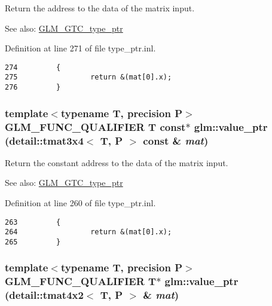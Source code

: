 Return the address to the data of the matrix input. \begin{Desc}
\item[See also:]\hyperlink{group__gtc__type__ptr}{GLM\_\-GTC\_\-type\_\-ptr} \end{Desc}


Definition at line 271 of file type\_\-ptr.inl.

\begin{Code}\begin{verbatim}274         {
275                 return &(mat[0].x);
276         }
\end{verbatim}
\end{Code}


\hypertarget{group__gtc__type__ptr_g7ac16d67cf7bb44cb53bc7e6a7c8bd2c}{
\subsubsection[value\_\-ptr]{\setlength{\rightskip}{0pt plus 5cm}template$<$typename T, precision P$>$ GLM\_\-FUNC\_\-QUALIFIER T const$\ast$ glm::value\_\-ptr (detail::tmat3x4$<$ T, P $>$ const \& {\em mat})}}
\label{group__gtc__type__ptr_g7ac16d67cf7bb44cb53bc7e6a7c8bd2c}


Return the constant address to the data of the matrix input. \begin{Desc}
\item[See also:]\hyperlink{group__gtc__type__ptr}{GLM\_\-GTC\_\-type\_\-ptr} \end{Desc}


Definition at line 260 of file type\_\-ptr.inl.

\begin{Code}\begin{verbatim}263         {
264                 return &(mat[0].x);
265         }
\end{verbatim}
\end{Code}


\hypertarget{group__gtc__type__ptr_gcf65ffcdfc741ebebedfc7a50e2bde7f}{
\subsubsection[value\_\-ptr]{\setlength{\rightskip}{0pt plus 5cm}template$<$typename T, precision P$>$ GLM\_\-FUNC\_\-QUALIFIER T$\ast$ glm::value\_\-ptr (detail::tmat4x2$<$ T, P $>$ \& {\em mat})}}
\label{group__gtc__type__ptr_gcf65ffcdfc741ebebedfc7a50e2bde7f}



